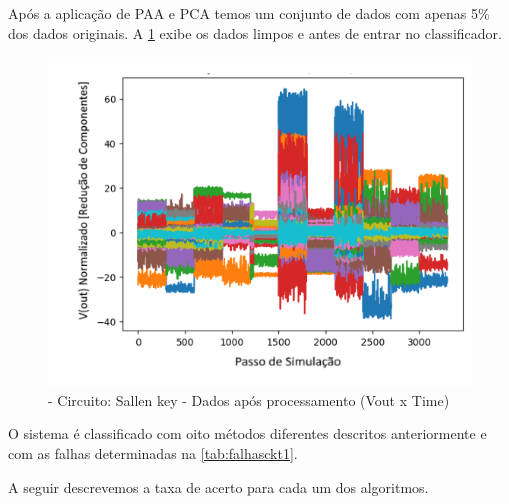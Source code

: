 Após a aplicação de PAA e PCA temos um conjunto de dados com apenas 5\% dos dados originais. A \ref{fig:pcaSalenkey} exibe os dados limpos e antes de entrar no classificador.

 \begin{figure}[H]
        \begin{center}
        \includegraphics[width=13cm]{./05_Cap5/figures/PCA_Sallen_Key_mc_+_4bitPRBS_[FALHA]raw.png}
        \caption{\label{fig:pcaSalenkey}- Circuito: Sallen key - Dados após processamento (Vout x Time)}
        \end{center}
        \end{figure}

O sistema é classificado com oito métodos diferentes descritos anteriormente e com as falhas determinadas na \ref{tab:falhasckt1}. 

A seguir descrevemos a taxa de acerto para cada um dos algoritmos. 


